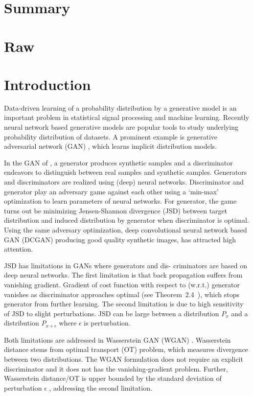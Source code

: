 \section{Summary}
\section{Raw}
\section{Introduction}

Data-driven learning of a probability distribution by a generative model is an important problem 
in statistical signal processing and machine learning. 
Recently neural network based generative models are popular tools to
study underlying probability distribution of datasets. A prominent example is 
generative adversarial network (GAN) \cite{NIPS2014_5423}, which learns 
implicit distribution models. 

In the GAN of \cite{NIPS2014_5423}, a generator produces
synthetic samples and a discriminator endeavors to
distinguish between real samples and synthetic samples. Generators and discriminators are realized using (deep) neural networks.
Discriminator and generator
play an adversary game against each other using a `min-max' optimization to learn parameters of neural networks. 
For generator, the game
turns out be minimizing Jensen-Shannon divergence (JSD) between
target distribution and induced distribution by generator when discriminator is
optimal. Using the same adversary
optimization, deep convolutional neural network based GAN (DCGAN)
\cite{2015arXiv151106434R} producing good quality synthetic images, has attracted high attention.

JSD has limitations in GANs where generators and dis-
criminators are based on deep neural networks. The first limitation is that back
propagation suffers from vanishing gradient. Gradient of cost
function with respect to (w.r.t.) generator vanishes as
discriminator approaches optimal (see Theorem~2.4~\cite{2017arXiv170104862A}),
which stops generator from further learning. The second limitation is due to high sensitivity of JSD to slight perturbations. JSD can be large between a distribution $P_x$ and a distribution $P_{x+\epsilon}$ where $\epsilon$ is perturbation\cite{2017arXiv170104862A}. 

Both limitations are addressed in Wasserstein GAN (WGAN)
\cite{2017arXiv170107875A}. Wasserstein distance stems from
optimal transport (OT) problem, which measures divergence between two
distributions. The WGAN formulation does not require an explicit
discriminator and it does not has the vanishing-gradient problem. Further,
Wasserstein distance/OT is upper bounded by the standard deviation of perturbation $\epsilon$
\cite{2017arXiv170104862A}, addressing the second limitation. 

